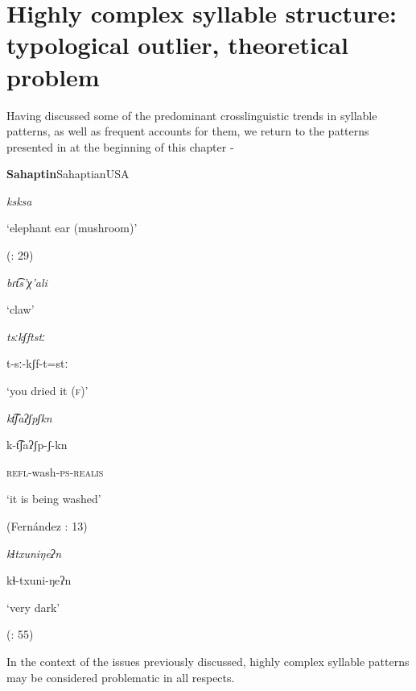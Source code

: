 \section{Highly complex syllable structure: typological outlier, theoretical problem}\label{sec:1.2}

  Having discussed some of the predominant crosslinguistic trends in syllable patterns, as well as frequent accounts for them, we return to the patterns presented in at the beginning of this chapter -

\ea\label{ex:(1.8)}
 \textbf{Sahaptin}{Sahaptian}{USA}

\textit{ksksa}

\glt ‘elephant ear (mushroom)’

(\citealt{HargusBeavert2006}: 29)
\z

\ea\label{ex:(1.9)}

\textit{bɾt͡s’χ’ali}

\glt ‘claw’

\citep[204]{Butskhrikidze2002}
\z

\ea\label{ex:(1.10)}

\textit{tsːkʃftstː}

t-sː-kʃf-t=stː

\glt ‘you dried it (\textsc{f})’

\citep[332]{Ridouane2008}

\z

\ea\label{ex:(1.11)}

\textit{kt͡ʃaʔʃpʃkn}

k-t͡ʃaʔʃp-ʃ-kn

\textsc{refl}-wash-\textsc{ps-realis}

\glt ‘it is being washed’

(Fernández \citealt{GarayHernández2006}: 13)
\z

\ea\label{ex:(1.12)}

\textit{kɬtxuniŋeʔn}

kɬ-txuni-ŋeʔn

\glt ‘very dark’

(\citealt{GeorgVolodin1999}: 55)

\z

In the context of the issues previously discussed, highly complex syllable patterns may be considered problematic in all respects.

